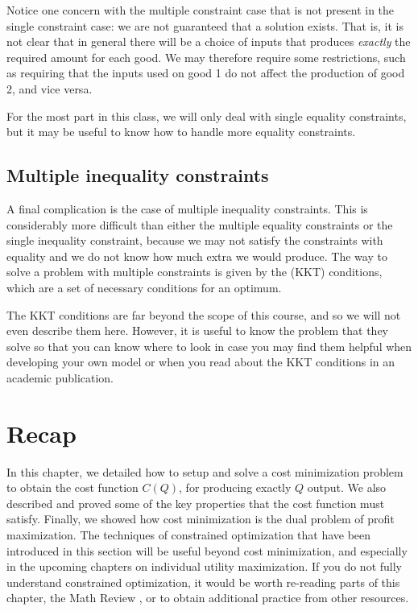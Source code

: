 Notice one concern with the multiple constraint case that is not present in the single constraint case: we are not guaranteed that a solution exists. That is, it is not clear that in general there will be a choice of inputs that produces \emph{exactly} the required amount for each good. We may therefore require some restrictions, such as requiring that the inputs used on good 1 do not affect the production of good 2, and vice versa.

For the most part in this class, we will only deal with single equality constraints, but it may be useful to know how to handle more equality constraints.

\subsection*{Multiple inequality constraints}
A final complication is the case of multiple inequality constraints. This is considerably more difficult than either the multiple equality constraints or the single inequality constraint, because we may not satisfy the constraints with equality and we do not know how much extra we would produce. The way to solve a problem with multiple constraints is given by the  (KKT) conditions, which are a set of necessary conditions for an optimum. 

The KKT conditions are far beyond the scope of this course, and so we will not even describe them here. However, it is useful to know the problem that they solve so that you can know where to look in case you may find them helpful when developing your own model or when you read about the KKT conditions in an academic publication. 

\section*{Recap}
In this chapter, we detailed how to setup and solve a cost minimization problem to obtain the cost function $C(Q)$, for producing exactly $Q$ output. We also described and proved some of the key properties that the cost function must satisfy. Finally, we showed how cost minimization is the dual problem of profit maximization. The techniques of constrained optimization that have been introduced in this section will be useful beyond cost minimization, and especially in the upcoming chapters on individual utility maximization. If you do not fully understand constrained optimization, it would be worth re-reading parts of this chapter, the Math Review , or to obtain additional practice from other resources. 